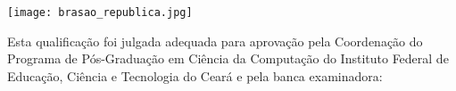 \begin{folhadeaprovacao}

    \begin{center}
    \texttt{[image: brasao\_republica.jpg]} \\
    \vspace{.5cm}
    {\ABNTEXchapterfont\large\imprimirinstituicao}
    \vspace{1cm}

    {\ABNTEXchapterfont\large\imprimirautor}

    
   \end{center}
   Esta qualificação foi julgada adequada para aprovação pela Coordenação do Programa de Pós-Graduação em Ciência
da Computação do Instituto Federal de Educação, Ciência e Tecnologia do Ceará e pela banca
examinadora:

\vfill

  \begin{center}
  \begin{minipage}{10cm}

   \if \imprimircoorientador
    
   \else
   \fi

   \if \nomeprofessorA \instituicaoprofessorA
    
   \else
    \assinatura{\textbf{\imprimirnomeprofessorA}  \\ \imprimirinstituicaoprofessorA}
   \fi

   \if \nomeprofessorB
    

\end{minipage}
\end{center}
\end{folhadeaprovacao}

